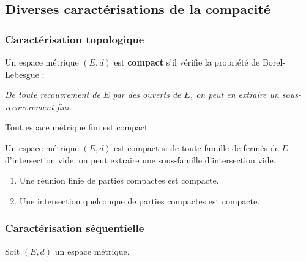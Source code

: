 




	\subsection{Diverses caractérisations de la compacité}

	\subsubsection{Caractérisation topologique}


	\begin{definition}
		Un espace métrique $(E, d)$ est \textbf{compact} s'il vérifie la propriété de Borel-Lebesgue :
		\begin{center}
			\textit{De toute recouvrement de $E$ par des ouverts de $E$, on peut en extraire un sous-recouvrement fini.}
		\end{center}
	\end{definition}

	\begin{example}
		Tout espace métrique fini est compact.
	\end{example}

	\begin{proposition}
		Un espace métrique $(E, d)$ est compact si de toute famille de fermés de $E$ d'intersection vide, on peut extraire une sous-famille d'intersection vide.
	\end{proposition}

	\begin{proposition}
		\begin{enumerate}[label=(\roman*)]
			\item Une réunion finie de parties compactes est compacte.
			\item Une intersection quelconque de parties compactes est compacte.
		\end{enumerate}
	\end{proposition}

	\subsubsection{Caractérisation séquentielle}


	Soit $(E,d)$ un espace métrique.


